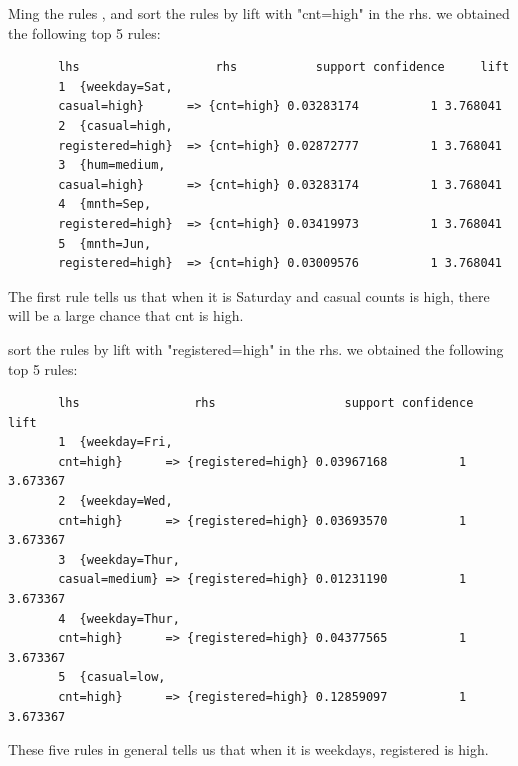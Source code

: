\documentclass[12pt]{article}
\begin{document}
	Ming the rules , and sort the rules by lift with "cnt=high" in the rhs. we obtained the following top 5 rules: \color{blue}
	\begin{verbatim}
	   lhs                   rhs           support confidence     lift
	   1  {weekday=Sat,                                                  
	   casual=high}      => {cnt=high} 0.03283174          1 3.768041
	   2  {casual=high,                                                  
	   registered=high}  => {cnt=high} 0.02872777          1 3.768041
	   3  {hum=medium,                                                   
	   casual=high}      => {cnt=high} 0.03283174          1 3.768041
	   4  {mnth=Sep,                                                     
	   registered=high}  => {cnt=high} 0.03419973          1 3.768041
	   5  {mnth=Jun,                                                     
	   registered=high}  => {cnt=high} 0.03009576          1 3.768041
	\end{verbatim} \color{black}
    The first rule tells us that when it is Saturday and casual counts is high, there will be a large chance that cnt is high.
    
    sort the rules by lift with "registered=high" in the rhs. we obtained the following top 5 rules: \color{blue}
	\begin{verbatim}
	   lhs                rhs                  support confidence     lift
	   1  {weekday=Fri,                                                      
	   cnt=high}      => {registered=high} 0.03967168          1 3.673367
	   2  {weekday=Wed,                                                      
	   cnt=high}      => {registered=high} 0.03693570          1 3.673367
	   3  {weekday=Thur,                                                     
	   casual=medium} => {registered=high} 0.01231190          1 3.673367
	   4  {weekday=Thur,                                                     
	   cnt=high}      => {registered=high} 0.04377565          1 3.673367
	   5  {casual=low,                                                       
	   cnt=high}      => {registered=high} 0.12859097          1 3.673367
	\end{verbatim}\color{black}
	These five rules in general tells us that when it is weekdays, registered is high.
	
\end{document}
